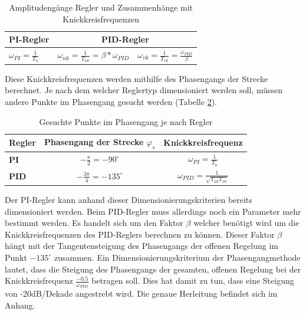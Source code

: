 \begin{table}[h]
\centering
\renewcommand*{\arraystretch}{1.7}
\begin{tabular}{|l|l|c|}
\hline 
\textbf{PI-Regler} & \multicolumn{2}{c|}{\textbf{PID-Regler}} \\ 
\hline 
$\omega_{PI}=\frac{1}{T_n}$ & $\omega_{nk}=\frac{1}{T_{nk}}=\beta*\omega_{PID}$ & $\omega_{vk}=\frac{1}{T_{vk}}=\frac{\omega_{PID}}{\beta}$ \\ 
\hline 
\end{tabular}
\caption[Amplitudengänge / Knickkreisfrequenzen]{Amplitudengänge Regler und Zusammenhänge mit Knickkreisfrequenzen}
\label{amplitudengaenge}
\renewcommand*{\arraystretch}{1} 
\end{table}

\newpage
Diese Knickkreisfrequenzen werden mithilfe des Phasengangs der Strecke berechnet. Je nach dem welcher Reglertyp dimensioniert werden soll, müssen andere Punkte im Phasengang gesucht werden (Tabelle \ref{phgangpunkte}).\newline

\begin{table}[h]
\centering
\renewcommand*{\arraystretch}{1.7}
\begin{tabular}{|l|c|c|}
\hline 
\textbf{Regler} & \textbf{Phasengang der Strecke $\varphi_s$} & \textbf{Knickkreisfrequenz}  \\ 
\hline 
\textbf{PI} & $-\frac{\pi}{2}=-90^\circ$ & $\omega_{PI}=\frac{1}{T_n}$ \\ 
\hline 
\textbf{PID} & $-\frac{3\pi}{4}=-135^\circ$ & $\omega_{PID}=\frac{1}{\sqrt{T_{nk}T_{vk}}}$ \\ 
\hline 
\end{tabular}
\caption[Wichtige Phasengangpunkte]{Gesuchte Punkte im Phasengang je nach Regler}
\label{phgangpunkte}
\renewcommand*{\arraystretch}{1} 
\end{table}

\newpage
Der PI-Regler kann anhand dieser Dimensionierungskriterien bereits dimensioniert werden. Beim PID-Regler muss allerdings noch ein Parameter mehr bestimmt werden. Es handelt sich um den Faktor $\beta$ welcher benötigt wird um die Knickkreisfrequenzen des PID-Reglers berechnen zu können. Dieser Faktor $\beta$ hängt mit der Tangentensteigung des Phasengangs der offenen Regelung im Punkt $-135^\circ$ zusammen.\newline
Ein Dimensionierungskriterium der Phasengangmethode lautet, dass die Steigung des Phasengangs der gesamten, offenen Regelung bei der Knickkreisfrequenz $\frac{-0.5}{\omega_{PID}}$ betragen soll. Dies hat damit zu tun, dass eine Steigung von -20dB/Dekade angestrebt wird. Die genaue Herleitung befindet sich im Anhang. \newline

